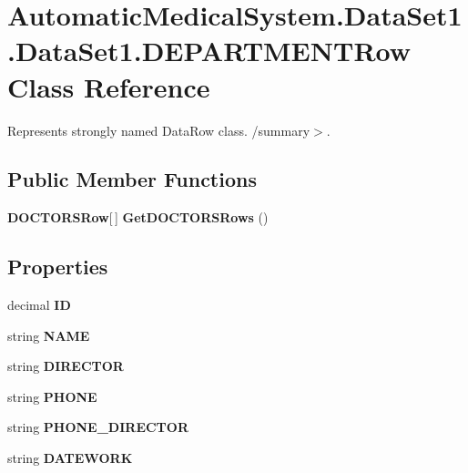 \section{AutomaticMedicalSystem.DataSet1.DataSet1.DEPARTMENTRow Class Reference}
\label{class_automatic_medical_system_1_1_data_set1_1_1_d_e_p_a_r_t_m_e_n_t_row}
Represents strongly named DataRow class. /summary$>$.  


\subsection*{Public Member Functions}
\begin{CompactItemize}
\item 
{\bf DOCTORSRow}[$\,$] \textbf{GetDOCTORSRows} ()\label{class_automatic_medical_system_1_1_data_set1_1_1_d_e_p_a_r_t_m_e_n_t_row_cd43cc2f1ad95d746c7ff8263c2cdca0}

\end{CompactItemize}
\subsection*{Properties}
\begin{CompactItemize}
\item 
decimal \textbf{ID}\hspace{0.3cm}{\tt  [get, set]}\label{class_automatic_medical_system_1_1_data_set1_1_1_d_e_p_a_r_t_m_e_n_t_row_d54928ebb385953b8710c66075ab9fa3}

\item 
string \textbf{NAME}\hspace{0.3cm}{\tt  [get, set]}\label{class_automatic_medical_system_1_1_data_set1_1_1_d_e_p_a_r_t_m_e_n_t_row_d0ebe6bb2df990c22b2f726e60f24ab3}

\item 
string \textbf{DIRECTOR}\hspace{0.3cm}{\tt  [get, set]}\label{class_automatic_medical_system_1_1_data_set1_1_1_d_e_p_a_r_t_m_e_n_t_row_915033f0b8c97a2b4c3182cf5eef627c}

\item 
string \textbf{PHONE}\hspace{0.3cm}{\tt  [get, set]}\label{class_automatic_medical_system_1_1_data_set1_1_1_d_e_p_a_r_t_m_e_n_t_row_a13a966f44fde5f6a83c0c5ac1948660}

\item 
string \textbf{PHONE\_\-DIRECTOR}\hspace{0.3cm}{\tt  [get, set]}\label{class_automatic_medical_system_1_1_data_set1_1_1_d_e_p_a_r_t_m_e_n_t_row_8c02e0b3617a430f1d7dc54db21f75bf}

\item 
string \textbf{DATEWORK}\hspace{0.3cm}{\tt  [get, set]}\label{class_automatic_medical_system_1_1_data_set1_1_1_d_e_p_a_r_t_m_e_n_t_row_cf7524dc97adabed8a16898c31ac30ef}

\end{CompactItemize}


